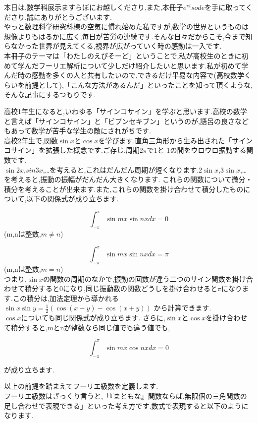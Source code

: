本日は,数学科展示ますらぼにお越しくださり,また,本冊子$e^{\pi i}sode$を手に取ってくださり,誠にありがとうございます.\\
やっと数理科学研究科棟の空気に慣れ始めた私ですが,数学の世界というものは想像よりもはるかに広く,毎日が苦労の連続です.そんな日々だからこそ,今まで知らなかった世界が見えてくる,視界が広がっていく時の感動は一入です.\\
本冊子のテーマは「わたしのえぴそーど」ということで,私が高校生のときに初めて学んだフーリエ解析について少しだけ紹介したいと思います.私が初めて学んだ時の感動を多くの人と共有したいので,できるだけ平易な内容で(高校数学くらいを前提として),「こんな方法があるんだ」といったことを知って頂くような,そんな記事にするつもりです.

高校1年生になると,いわゆる「サインコサイン」を学ぶと思います.高校の数学と言えば「サインコサイン」と「ビブンセキブン」というのが,語呂の良さなどもあって数学が苦手な学生の敵にされがちです.\\
高校2年生で,関数$\sin x$と$\cos x$を学びます.直角三角形から生み出された「サインコサイン」を拡張した概念です.ご存じ,周期$2 \pi$で1と-1の間をウロウロ振動する関数です.\\
$\sin 2x$,$sin 3x$,…を考えると,これはだんだん周期が短くなります.$2\sin x$,$3\sin x$,…を考えると,振動の振幅がだんだん大きくなります.
これらの関数について微分・積分を考えることが出来ます.また,これらの関数を掛け合わせて積分したものについて,以下の関係式が成り立ちます.

\[
\int_{-\pi}^\pi \sin mx \sin nx dx = 0
\]
(m,nは整数,$m \neq n$)

\[
  \int_{-\pi}^\pi \sin mx \sin nx dx = \pi
\]
(m,nは整数,$m = n$)\\


つまり,$\sin x$の関数の周期のなかで,振動の回数が違う二つのサイン関数を掛け合わせて積分すると0になり,同じ振動数の関数どうしを掛け合わせると$\pi$になります.この積分は,加法定理から導かれる
$\sin x \sin y = \frac{1}{2} (\cos(x-y)-\cos(x+y))$
から計算できます.\\
$\cos x$についても同じ関係式が成り立ちます.
さらに,$\sin x$と$\cos x$を掛け合わせて積分すると,mとnが整数なら同じ値でも違う値でも,

\[
  \int_{-\pi}^\pi \sin mx \cos nx dx = 0
\]

が成り立ちます.

以上の前提を踏まえてフーリエ級数を定義します.\\
フーリエ級数はざっくり言うと,「『まともな』関数ならば,無限個の三角関数の足し合わせで表現できる」といった考え方です.数式で表現すると以下のようになります.

